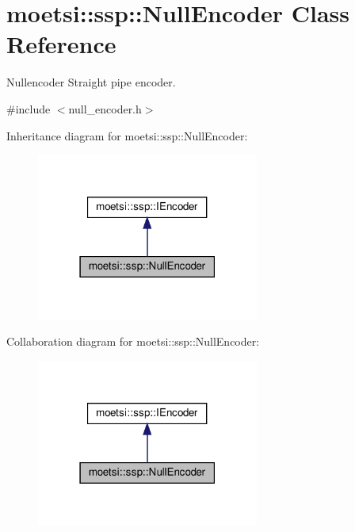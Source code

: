\hypertarget{classmoetsi_1_1ssp_1_1NullEncoder}{}\section{moetsi\+:\+:ssp\+:\+:Null\+Encoder Class Reference}
\label{classmoetsi_1_1ssp_1_1NullEncoder}


Nullencoder Straight pipe encoder.  




{\ttfamily \#include $<$null\+\_\+encoder.\+h$>$}



Inheritance diagram for moetsi\+:\+:ssp\+:\+:Null\+Encoder\+:\nopagebreak
\begin{figure}[H]
\begin{center}
\leavevmode
\includegraphics[width=207pt]{classmoetsi_1_1ssp_1_1NullEncoder__inherit__graph}
\end{center}
\end{figure}


Collaboration diagram for moetsi\+:\+:ssp\+:\+:Null\+Encoder\+:\nopagebreak
\begin{figure}[H]
\begin{center}
\leavevmode
\includegraphics[width=207pt]{classmoetsi_1_1ssp_1_1NullEncoder__coll__graph}
\end{center}
\end{figure}
